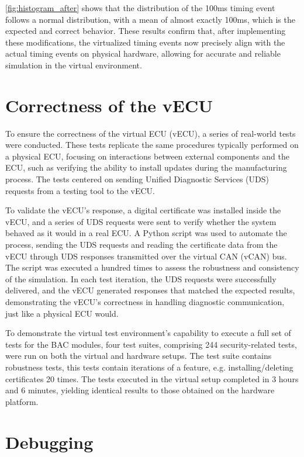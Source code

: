 \autoref{fig:histogram_after}  shows that the distribution of the 100ms timing event follows a normal distribution, with a mean of almost exactly 100ms, which is the expected and correct behavior.  These results confirm that, after implementing these modifications, the virtualized timing events now precisely align with the actual timing events on physical hardware, allowing for accurate and reliable simulation in the virtual environment.

\section{Correctness of the vECU}
To ensure the correctness of the virtual ECU (vECU), a series of real-world tests were conducted. These tests replicate the same procedures typically performed on a physical ECU, focusing on interactions between external components and the ECU, such as verifying the ability to install updates during the manufacturing process. The tests centered on sending Unified Diagnostic Services (UDS) requests from a testing tool to the vECU. 

To validate the vECU's response, a digital certificate was installed inside the vECU, and a series of UDS requests were sent to verify whether the system behaved as it would in a real ECU. A Python script was used to automate the process, sending the UDS requests and reading the certificate data from the vECU through UDS responses transmitted over the virtual CAN (vCAN) bus. The script was executed a hundred times to assess the robustness and consistency of the simulation. In each test iteration, the UDS requests were successfully delivered, and the vECU generated responses that matched the expected results, demonstrating the vECU’s correctness in handling diagnostic communication, just like a physical ECU would.

To demonstrate the virtual test environment's capability to execute a full set of tests for the BAC modules, four test suites, comprising 244 security-related tests, were run on both the virtual and hardware setups. The test suite contains robustness tests, this tests contain iterations of a feature, e.g. installing/deleting certificates 20 times. The tests executed in the virtual setup completed in 3 hours and 6 minutes, yielding identical results to those obtained on the hardware platform.

\section{Debugging}

